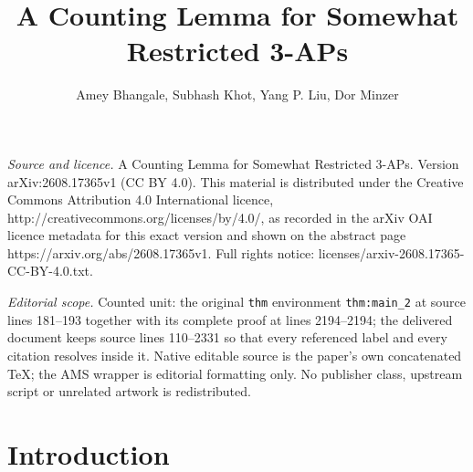 \documentclass[10pt,a4paper]{amsart}
\begin{document}
\title[A Counting Lemma for Somewhat Restricted 3-APs]{A Counting Lemma for Somewhat Restricted 3-APs}
\author{Amey Bhangale, Subhash Khot, Yang P. Liu, Dor Minzer}
\date{}
\maketitle
\noindent\emph{Source and licence.} A Counting Lemma for Somewhat Restricted 3-APs. Version arXiv:2608.17365v1 (CC BY 4.0). This material is distributed under the Creative Commons Attribution 4.0 International licence, http://creativecommons.org/licenses/by/4.0/, as recorded in the arXiv OAI licence metadata for this exact version and shown on the abstract page https://arxiv.org/abs/2608.17365v1. Full rights notice: licenses/arxiv-2608.17365-CC-BY-4.0.txt.\par\smallskip
\noindent\textit{Editorial scope.} Counted unit: the original \texttt{thm} environment \texttt{thm:main\_2} at source lines 181--193 together with its complete proof at lines 2194--2194; the delivered document keeps source lines 110--2331 so that every referenced label and every citation resolves inside it. Native editable source is the paper's own concatenated TeX; the AMS wrapper is editorial formatting only. No publisher class, upstream script or unrelated artwork is redistributed.
\section{Introduction}
\end{document}

